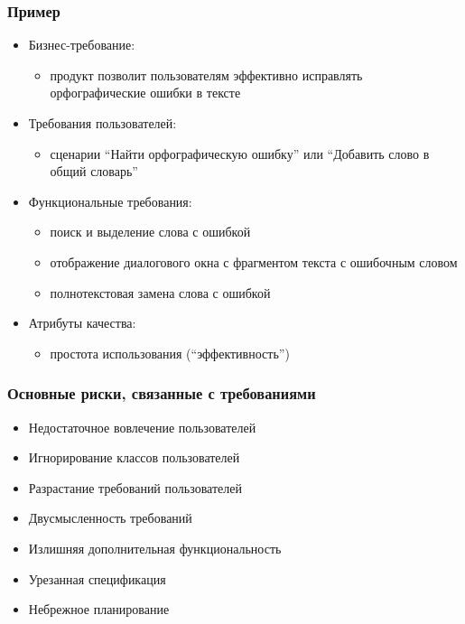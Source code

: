 \documentclass{../../slides-style}
\begin{document}
    \begin{frame}
        \frametitle{Пример}
        \begin{itemize}
            \item Бизнес-требование:
            \begin{itemize}
                \item продукт позволит пользователям эффективно исправлять орфографические ошибки в тексте
            \end{itemize}
            \item Требования пользователей:
            \begin{itemize}
                \item сценарии ``Найти орфографическую ошибку'' или ``Добавить слово в общий словарь''
            \end{itemize}
            \item Функциональные требования:
            \begin{itemize}
                \item поиск и выделение слова с ошибкой
                \item отображение диалогового окна с фрагментом текста с ошибочным словом
                \item полнотекстовая замена слова с ошибкой
            \end{itemize}
            \item Атрибуты качества:
            \begin{itemize}
                \item простота использования (``эффективность'')
            \end{itemize}
        \end{itemize}
    \end{frame}

    \begin{frame}
        \frametitle{Основные риски, связанные с требованиями}
        \begin{itemize}
            \item Недостаточное вовлечение пользователей
            \item Игнорирование классов пользователей
            \item Разрастание требований пользователей
            \item Двусмысленность требований
            \item Излишняя дополнительная функциональность
            \item Урезанная спецификация
            \item Небрежное планирование
        \end{itemize}
    \end{frame}
\end{document}
